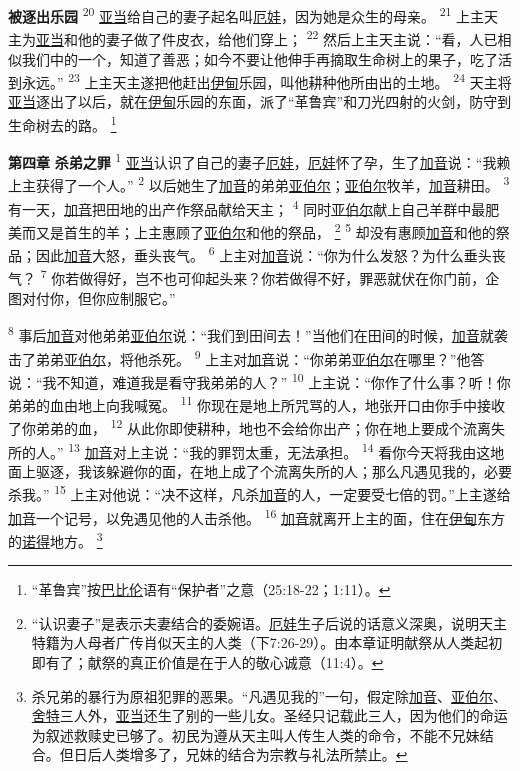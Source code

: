 \textbf{被逐出乐园 }
\textsuperscript{20}
\uline{亚当}给自己的妻子起名叫\uline{厄娃}，因为她是众生的母亲。
\textsuperscript{21}
上主天主为\uline{亚当}和他的妻子做了件皮衣，给他们穿上；
\textsuperscript{22}
然后上主天主说：“看，人已相似我们中的一个，知道了善恶；如今不要让他伸手再摘取生命树上的果子，吃了活到永远。”
\textsuperscript{23}
上主天主遂把他赶出\uline{伊甸}乐园，叫他耕种他所由出的土地。
\textsuperscript{24}
天主将\uline{亚当}逐出了以后，就在\uline{伊甸}乐园的东面，派了“革鲁宾”和刀光四射的火剑，防守到生命树去的路。
\footnote{“革鲁宾”按\uline{巴比伦}语有“保护者”之意（25:18-22；1:11）。}

\textbf{第四章 }
\textbf{杀弟之罪 }
\textsuperscript{1}
\uline{亚当}认识了自己的妻子\uline{厄娃}，\uline{厄娃}怀了孕，生了\uline{加音}说：“我赖上主获得了一个人。”
\textsuperscript{2}
以后她生了\uline{加音}的弟弟\uline{亚伯尔}；\uline{亚伯尔}牧羊，\uline{加音}耕田。
\textsuperscript{3}
有一天，\uline{加音}把田地的出产作祭品献给天主；
\textsuperscript{4}
同时\uline{亚伯尔}献上自己羊群中最肥美而又是首生的羊；上主惠顾了\uline{亚伯尔}和他的祭品，
\footnote{“认识妻子”是表示夫妻结合的委婉语。\uline{厄娃}生子后说的话意义深奥，说明天主特籍为人母者广传肖似天主的人类（下7:26-29）。由本章证明献祭从人类起初即有了；献祭的真正价值是在于人的敬心诚意（11:4）。}
\textsuperscript{5}
却没有惠顾\uline{加音}和他的祭品；因此\uline{加音}大怒，垂头丧气。
\textsuperscript{6}
上主对\uline{加音}说：“你为什么发怒？为什么垂头丧气？
\textsuperscript{7}
你若做得好，岂不也可仰起头来？你若做得不好，罪恶就伏在你门前，企图对付你，但你应制服它。”

\textsuperscript{8}
事后\uline{加音}对他弟弟\uline{亚伯尔}说：“我们到田间去！”当他们在田间的时候，\uline{加音}就袭击了弟弟\uline{亚伯尔}，将他杀死。
\textsuperscript{9}
上主对\uline{加音}说：“你弟弟\uline{亚伯尔}在哪里？”他答说：“我不知道，难道我是看守我弟弟的人？”
\textsuperscript{10}
上主说：“你作了什么事？听！你弟弟的血由地上向我喊冤。
\textsuperscript{11}
你现在是地上所咒骂的人，地张开口由你手中接收了你弟弟的血，
\textsuperscript{12}
从此你即使耕种，地也不会给你出产；你在地上要成个流离失所的人。”
\textsuperscript{13}
\uline{加音}对上主说：“我的罪罚太重，无法承担。
\textsuperscript{14}
看你今天将我由这地面上驱逐，我该躲避你的面，在地上成了个流离失所的人；那么凡遇见我的，必要杀我。”
\textsuperscript{15}
上主对他说：“决不这样，凡杀\uline{加音}的人，一定要受七倍的罚。”上主遂给\uline{加音}一个记号，以免遇见他的人击杀他。
\textsuperscript{16}
\uline{加音}就离开上主的面，住在\uline{伊甸}东方的\uline{诺得}地方。
\footnote{杀兄弟的暴行为原祖犯罪的恶果。“凡遇见我的”一句，假定除\uline{加音}、\uline{亚伯尔}、\uline{舍特}三人外，\uline{亚当}还生了别的一些儿女。圣经只记载此三人，因为他们的命运为叙述救赎史已够了。初民为遵从天主叫人传生人类的命令，不能不兄妹结合。但日后人类增多了，兄妹的结合为宗教与礼法所禁止。}

